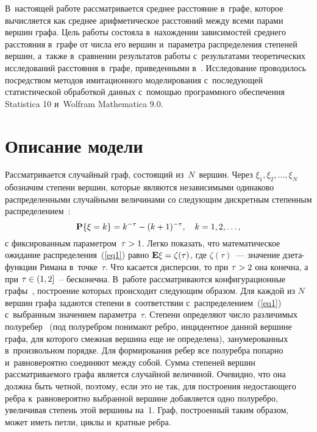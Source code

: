 \begin{multicols}{2}
В~на\-сто\-ящей работе рассматривается среднее расстояние в~графе,
которое вы\-чис\-ля\-ет\-ся как среднее арифметическое расстояний между всеми парами вершин графа.
Цель работы со\-сто\-яла в~на\-хож\-де\-нии зависимостей среднего расстояния в~графе от числа его вершин и~па\-ра\-мет\-ра 
распределения степеней вершин, а~также в~сравнении результатов работы с~результатами тео\-ре\-ти\-че\-ских
исследований рас\-сто\-яния в~графе, приведенными в~\cite{Hof2}.
Исследование проводилось по\-средст\-вом методов имитационного моделирования с~по\-сле\-ду\-ющей статистической
обработкой данных с~помощью программного обеспечения Statistica 10 и~Wolfram Mathematica 9.0.

\section{Описание модели}

Рассматривается случайный граф, со\-сто\-ящий из~$N$~вершин. Через $\xi_1,\xi_2,\ldots,\xi_N$ обозначим
степени вершин, которые являются независимыми одинаково распределенными случайными величинами
со сле\-ду\-ющим дискретным степенным распределением~\cite{RN}:
\begin{equation}
\label{eq1}
{\bf P}\{\xi = k\} = k^{-\tau} - (k+1)^{-\tau}, \quad k=1,2,\ldots,
\end{equation}
с фиксированным параметром~$\tau\hm>1$. Легко показать, что математическое ожидание
распределения~(\ref{eq1}) рав\-но ${\bf E}\xi\hm=\zeta(\tau)$, где $\zeta(\tau)$~--- значение дзе\-та-функ\-ции
Римана в~точке~$\tau$. Что касается дисперсии, то при $\tau\hm>2$ она конечна, а при
$\tau\hm\in(1,2]$~-- бесконечна.
В~работе рассматриваются конфигурационные графы~\cite{Bol}, построение которых происходит сле\-ду\-ющим
образом.
Для каждой из $N$ вершин графа задаются степени в~соответствии  с~распределением~(\ref{eq1}) с~выбранным
значением па\-ра\-мет\-ра~$\tau$. Степени определяют чис\-ло различимых полуребер~\cite{RN} (под полуребром понимают
ребро, инцидентное данной вершине графа, для которого смежная вершина еще не определена), занумерованных в~произвольном порядке. 
Для формирования ребер все полуребра попарно и~равновероятно соединяют между собой.
Сумма степеней вершин рас\-смат\-ри\-ва\-емо\-го графа является случайной величиной. Очевидно, что она должна быть чет\-ной,
поэтому, если это не так, для построения недостающего ребра к~равновероятно выбранной
вершине добавляется одно полуребро, увеличивая степень этой вершины на~1. Граф, по\-стро\-ен\-ный таким
образом, может иметь пет\-ли, цик\-лы и~кратные \mbox{ребра}.


\end{multicols}
